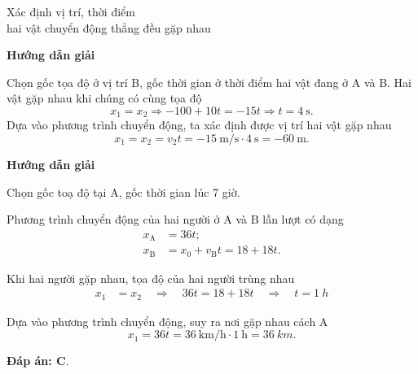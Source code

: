 \begin{dang}{Xác định vị trí, thời điểm \\hai vật chuyển động thẳng đều gặp nhau}
	{	\begin{center}
			\textbf{Hướng dẫn giải}
		\end{center}
		Chọn gốc tọa độ ở vị trí B, gốc thời gian ở thời điểm hai vật đang ở A và B. 
		Hai vật gặp nhau khi chúng có cùng tọa độ
		\begin{equation*}
			x_\text{1}=x_\text{2}\Rightarrow -100+10t=-15t \Rightarrow t=\SI{4}{\second}.
		\end{equation*}
		Dựa vào phương trình chuyển động, ta xác định được vị trí hai vật gặp nhau 
		\begin{equation*}
			x_\text{1}=x_\text{2}=v_\text{2}t=\SI{-15}{\meter/\second}\cdot\SI{4}{\second}=\SI{-60}{\meter}.
		\end{equation*}
	}
	{	\begin{center}
			\textbf{Hướng dẫn giải}
		\end{center}
		
		Chọn gốc toạ độ tại A, gốc thời gian lúc 7 giờ.
		
		Phương trình chuyển động của hai người ở A và B lần lượt có dạng 
			\begin{align*}
				x_\text{A} &= 36t;\\
				x_\text{B} &=x_0+v_\text{B}t=18+18t.
			\end{align*}
		
		Khi hai người gặp nhau, tọa độ của hai người trùng nhau  
			\begin{align*}
				x_1&=x_2 \quad
				\Rightarrow\quad 36t=18+18t\quad\Rightarrow\quad t=\SI{1}{h}
			\end{align*}
		
		Dựa vào phương trình chuyển động, suy ra nơi gặp nhau cách A
			$$x_\text{1}  =36t=\SI{36}{\kilo\meter/\hour}\cdot\SI{1}{\hour}= \SI{36}{km}.$$
		
		
		\textbf{Đáp án: C}.
	}
\end{dang}

